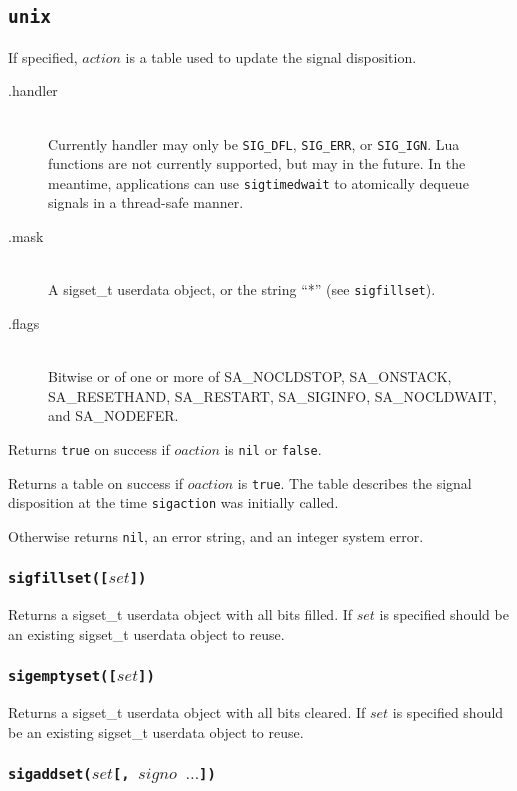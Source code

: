\documentclass[11pt, oneside]{memoir}
\newcommand*{\true}[0]{\texttt{true}\xspace}
\newcommand*{\false}[0]{\texttt{false}\xspace}
\newcommand*{\nil}[0]{\texttt{nil}\xspace}
\newcommand*{\syscall}[1]{\texttt{#1}\xspace}
\newcommand*{\fn}[1]{\texttt{#1}\xspace}
\newcounter{toccols}
\newenvironment{Module}[1]{
	\subsection{\texttt{#1}}
	\addtocontents{toc}{
		\protect\begin{multicols}{\value{toccols}}
	}
}{
	\addtocontents{toc}{\protect\end{multicols}}
}
\begin{document}
\begin{Module}{unix}
If specified, $action$ is a table used to update the signal disposition.

\begin{description}
\item[.handler] \hfill \\
Currently handler may only be \texttt{SIG\_DFL}, \texttt{SIG\_ERR}, or \texttt{SIG\_IGN}.
Lua functions are not currently supported, but may in the future. In the meantime, applications can use \fn{sigtimedwait} to atomically dequeue signals in a thread-safe manner.
\item[.mask] \hfill \\
A sigset\_t userdata object, or the string ``*'' (see \fn{sigfillset}).
\item[.flags] \hfill \\
Bitwise or of one or more of SA\_NOCLDSTOP, SA\_ONSTACK, SA\_RESETHAND, SA\_RESTART, SA\_SIGINFO, SA\_NOCLDWAIT, and SA\_NODEFER.
\end{description}

Returns \true on success if $oaction$ is \nil or \false.

Returns a table on success if $oaction$ is \true. The table describes the signal disposition at the time \syscall{sigaction} was initially called.

Otherwise returns \nil, an error string, and an integer system error.

\subsubsection[\fn{sigfillset}]{\fn{sigfillset([$set$])}}

Returns a sigset\_t userdata object with all bits filled. If $set$ is specified should be an existing
sigset\_t userdata object to reuse.

\subsubsection[\fn{sigemptyset}]{\fn{sigemptyset([$set$])}}

Returns a sigset\_t userdata object with all bits cleared. If $set$ is specified should be an existing
sigset\_t userdata object to reuse.

\subsubsection[\fn{sigaddset}]{\fn{sigaddset($set$[, $signo$ $\ldots$])}}


\end{Module}
\end{document}
